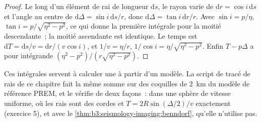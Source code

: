 \begin{proof}
Le long d'un élément de rai de longueur $\mathrm ds$, le rayon varie de
$\mathrm dr = \cos i\,\mathrm ds$ et l'angle au centre de
$\mathrm d\Delta = \sin i\,\mathrm ds/r$, donc $\mathrm d\Delta = \tan i\,\mathrm dr/r$.
Avec $\sin i = p/\eta$, $\tan i = p/\sqrt{\eta^2 - p^2}$, ce qui donne la première
intégrale pour la moitié descendante~; la moitié ascendante est identique. Le temps est
$\mathrm dT = \mathrm ds/v = \mathrm dr/(v\cos i)$, et $1/v = \eta/r$,
$1/\cos i = \eta/\sqrt{\eta^2 - p^2}$. Enfin $T - p\Delta$ a pour intégrande
$(\eta^2 - p^2)/(r\sqrt{\eta^2 - p^2})$.
\end{proof}

Ces intégrales servent à calculer une  à partir d'un modèle. La
script de tracé de rais de ce chapitre fait la même somme sur des coquilles de 2~km du
modèle de référence PREM, %
et le vérifie de deux façons~: dans une sphère de vitesse uniforme, où les rais sont
des cordes et $T = 2R\sin(\Delta/2)/v$ exactement (exercice 5), et
avec le \cref{thm:b3:seismology-imaging:benndorf}, qu'elle n'utilise pas.

